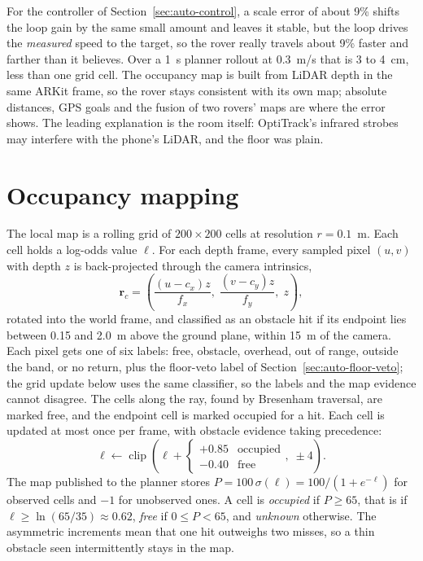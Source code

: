 For the controller of Section~\ref{sec:auto-control}, a scale error of about 9\% shifts the loop gain by the same small amount and leaves it stable, but the loop drives the \emph{measured} speed to the target, so the rover really travels about 9\% faster and farther than it believes.
Over a 1~s planner rollout at 0.3~m/s that is 3 to 4~cm, less than one grid cell.
The occupancy map is built from LiDAR depth in the same ARKit frame, so the rover stays consistent with its own map; absolute distances, GPS goals and the fusion of two rovers' maps are where the error shows.
The leading explanation is the room itself: OptiTrack's infrared strobes may interfere with the phone's LiDAR, and the floor was plain.

\section{Occupancy mapping}
\label{sec:auto-map}

The local map is a rolling grid of $200 \times 200$ cells at resolution $r = 0.1$~m.
Each cell holds a log-odds value $\ell$.
For each depth frame, every sampled pixel $(u, v)$ with depth $z$ is back-projected through the camera intrinsics,
\begin{equation}
  \mathbf{r}_c = \left(\frac{(u - c_x) z}{f_x},\; \frac{(v - c_y) z}{f_y},\; z\right),
\end{equation}
rotated into the world frame, and classified as an obstacle hit if its endpoint lies between 0.15 and 2.0~m above the ground plane, within 15~m of the camera.
Each pixel gets one of six labels: free, obstacle, overhead, out of range, outside the band, or no return, plus the floor-veto label of Section~\ref{sec:auto-floor-veto}; the grid update below uses the same classifier, so the labels and the map evidence cannot disagree.
The cells along the ray, found by Bresenham traversal, are marked free, and the endpoint cell is marked occupied for a hit.
Each cell is updated at most once per frame, with obstacle evidence taking precedence:
\begin{equation}
  \ell \leftarrow \operatorname{clip}\!\left(\ell + \begin{cases} +0.85 & \text{occupied} \\ -0.40 & \text{free} \end{cases},\; \pm 4\right).
\end{equation}
The map published to the planner stores $P = 100\,\sigma(\ell) = 100 / (1 + e^{-\ell})$ for observed cells and $-1$ for unobserved ones.
A cell is \emph{occupied} if $P \ge 65$, that is if $\ell \ge \ln(65/35) \approx 0.62$, \emph{free} if $0 \le P < 65$, and \emph{unknown} otherwise.
The asymmetric increments mean that one hit outweighs two misses, so a thin obstacle seen intermittently stays in the map.

